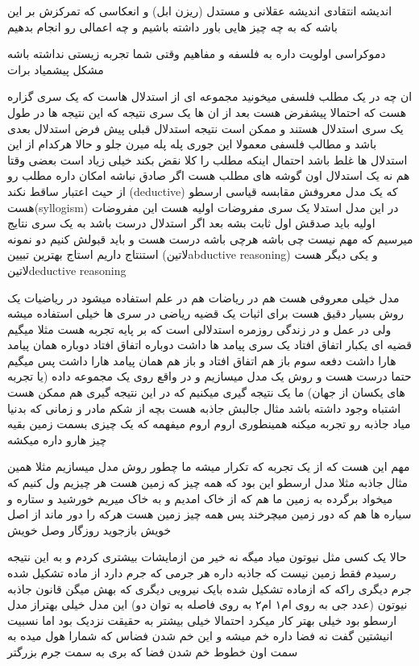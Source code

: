\documentclass{article}
\begin{document}
	
		 اندیشه انتقادی اندیشه عقلانی و مستدل (ریزن ابل) و انعکاسی که تمرکزش بر این باشه که به چه چیز هایی 
		باور داشته باشیم و چه اعمالی رو انجام بدهیم 
	
		 دموکراسی اولویت داره به فلسفه و مفاهیم وقتی شما تجربه زیستی نداشته باشه مشکل پیشمیاد برات
		
		 ان چه در یک مطلب فلسفی میخونید مجموعه ای از استدلال هاست که یک سری گزاره هست که احتمالا پیشفرض هست بعد از ان ها 
		یک سری نتیجه که این نتیجه ها در طول یک سری استدلال هستند و ممکن است نتیجه استدلال قبلی پیش فرض استدلال بعدی باشد و مطالب فلسفی 
		معمولا این جوری پله پله میرن جلو و حالا هرکدام از این استدلال ها غلط باشد احتمال اینکه مطلب را کلا نقض بکند خیلی زیاد است بعضی 
		وقتا هم نه یک استدلال اون گوشه های مطلب هست اگر صادق نباشه امکان داره مطلب رو از حیث اعتبار ساقط نکند 
		 (deductive) که یک مدل معروفش مقابسه قیاسی ارسطو هست(syllogism) در این مدل استدلا یک سری 
		مفروضات اولیه هست این مفروضات اولیه باید صدقش اول ثابت بشه بعد اگر استدلال درست باشد به یک سری نتایج میرسیم که مهم نیست چی باشه 
		هرچی باشه درست هست و باید قبولش کنیم
		دو نمونه استنتاج داریم استاج بهترین تبیین (‌لاتین{abductive reasoning}) و یکی دیگر هست ‌لاتین{deductive reasoning} 
		
		 مدل خیلی معروفی هست هم در ریاضات هم در علم استفاده میشود در ریاضیات یک روش بسیار دقیق هست برای 
		اثبات یک قضیه ریاضی در سری ها خیلی استفاده میشه ولی در عمل و در زندگی روزمره استدلالی است که بر پایه تجربه هست مثلا میگیم قضیه
		ای یکبار اتفاق افتاد یک سری پیامد ها داشت دوباره اتفاق افتاد دوباره همان پیامد هارا داشت دفعه سوم باز هم اتفاق افتاد و باز هم
		همان پیامد هارا داشت پس میگیم حتما درست هست و روش یک مدل میسازیم و در واقع روی یک مجموعه داده (یا تجربه های یکسان از جهان) ما 
		یک نتیجه گیری میکنیم که در این نتیجه گیری هم ممکن هست اشتباه وجود داشته باشد مثال جالبش جاذبه هست بچه از شکم مادر و زمانی که 
		بدنیا میاد جاذبه رو تجربه میکنه همینطوری اروم اروم میفهمه که یک چیزی بسمت زمین بقیه چیز هارو داره میکشه
		
		مهم این هست که از یک تجربه که تکرار میشه ما چطور روش مدل میسازیم مثلا همین مثال جاذبه مثلا مدل ارسطو این بود که همه چیز که زمین 
		هست هر چیزیم ول کنیم که میخواد برگرده به زمین ما هم که از خاک امدیم و به خاک میریم خورشید و ستاره و سیاره ها هم که دور زمین 
		میچرخند پس همه چیز زمین هست هرکه را دور ماند از اصل خویش  بازجوید روزگار وصل خویش
		
		حالا یک کسی مثل نیوتون میاد میگه نه خیر من ازمایشات بیشتری کردم و به این نتیجه رسیدم فقط زمین نیست که جاذبه داره هر جرمی که جرم 
		دارد از ماده تشکیل شده جرم دیگری راکه که ازماده تشکیل شده بایک نیرویی دیگری که بهش میگن قانون جاذبه نیوتون (عدد جی به 
		روی ام۱ ام۲ به روی فاصله به توان دو) این مدل خیلی بهتراز مدل ارسطو بود خیلی بهتر کار میکرد احتمالا خیلی بیشتر به حقیقت نزدیک بود
		اما نسبیت انیشتین گفت نه فضا داره خم میشه و این خم شدن فضاس که شمارا هول میده به سمت اون خطوط خم شدن فضا که بری به سمت جرم 
		بزرگتر
		
\end{document}
